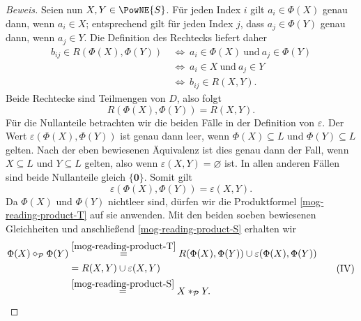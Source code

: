 \begin{proof}[Beweis]
Seien nun \(X,Y\in\PowNE{S}\). Für jeden Index \(i\) gilt
\(a_i\in\Phi(X)\) genau dann, wenn \(a_i\in X\);
entsprechend gilt für jeden Index \(j\), dass
\(a_j\in\Phi(Y)\) genau dann, wenn \(a_j\in Y\).
Die Definition des Rechtecks liefert daher
\[
  \begin{aligned}
    b_{ij}\in R(\Phi(X),\Phi(Y))
      &\ \Longleftrightarrow\ a_i\in\Phi(X)\ \text{und}\ a_j\in\Phi(Y)\\
      &\ \Longleftrightarrow\ a_i\in X\ \text{und}\ a_j\in Y\\
      &\ \Longleftrightarrow\ b_{ij}\in R(X,Y).
  \end{aligned}
\]
Beide Rechtecke sind Teilmengen von \(D\), also folgt
\[
  R(\Phi(X),\Phi(Y))=R(X,Y).
\]
Für die Nullanteile betrachten wir die beiden Fälle in der Definition
von \(\varepsilon\). Der Wert \(\varepsilon(\Phi(X),\Phi(Y))\) ist genau
dann leer, wenn \(\Phi(X)\subseteq L\) und
\(\Phi(Y)\subseteq L\) gelten. Nach der eben bewiesenen
Äquivalenz ist dies genau dann der Fall, wenn \(X\subseteq L\)
und \(Y\subseteq L\) gelten, also wenn
\(\varepsilon(X,Y)=\varnothing\) ist. In allen anderen Fällen
sind beide Nullanteile gleich \(\{\mathbf0\}\). Somit gilt
\[
  \varepsilon(\Phi(X),\Phi(Y))=\varepsilon(X,Y).
\]
Da \(\Phi(X)\) und \(\Phi(Y)\) nichtleer sind, dürfen wir die
Produktformel \eqref{mog-reading-product-T} auf sie anwenden.
Mit den beiden soeben bewiesenen Gleichheiten und anschließend
\eqref{mog-reading-product-S} erhalten wir
\begin{equation}
  \begin{aligned}
    \Phi(X)\mathbin{\diamond}_{\mathcal P}\Phi(Y)
      &\overset{\eqref{mog-reading-product-T}}{=}
        R(\Phi(X),\Phi(Y))\cup\varepsilon(\Phi(X),\Phi(Y))\\
      &=R(X,Y)\cup\varepsilon(X,Y)\\
      &\overset{\eqref{mog-reading-product-S}}{=}
        X\mathbin{\ast}_{\mathcal P}Y.
  \end{aligned}
  \tag{IV}\label{mog-reading-product-images}
\end{equation}


\end{proof}
